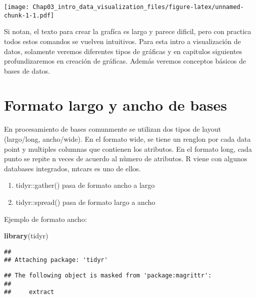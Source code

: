 \documentclass[]{book}
\newenvironment{Shaded}{\begin{snugshade}}{\end{snugshade}}
\newcommand{\DataTypeTok}[1]{\textcolor[rgb]{0.13,0.29,0.53}{#1}}
\newcommand{\KeywordTok}[1]{\textcolor[rgb]{0.13,0.29,0.53}{\textbf{#1}}}
\newcommand{\NormalTok}[1]{#1}
\newcommand{\OperatorTok}[1]{\textcolor[rgb]{0.81,0.36,0.00}{\textbf{#1}}}
\newcommand{\StringTok}[1]{\textcolor[rgb]{0.31,0.60,0.02}{#1}}
\providecommand{\tightlist}{%
  \setlength{\itemsep}{0pt}\setlength{\parskip}{0pt}}
\begin{document}
\texttt{[image: Chap03\_intro\_data\_visualization\_files/figure-latex/unnamed-chunk-1-1.pdf]}

Si notan, el texto para crear la grafíca es largo y parece dificil, pero con practica todos estos comandos se vuelven intuitivos. Para esta intro a visualización de datos, solamente veremos diferentes tipos de gráficas y en capitulos siguientes profundizaremos en creación de gráficas. Además veremos conceptos básicos de bases de datos.

\hypertarget{formato-largo-y-ancho-de-bases}{%
\section{Formato largo y ancho de bases}\label{formato-largo-y-ancho-de-bases}}

En procesamiento de bases comunmente se utilizan dos tipos de layout (largo/long, ancho/wide). En el formato wide, se tiene un renglon por cada data point y multiples columnas que contienen los atributos. En el formato long, cada punto se repite n veces de acuerdo al nùmero de atributos. R viene con algunos databases integrados, mtcars es uno de ellos.

\begin{enumerate}
\def\labelenumi{\arabic{enumi}.}
\tightlist
\item
  tidyr::gather() pasa de formato ancho a largo
\item
  tidyr::spread() pasa de formato largo a ancho
\end{enumerate}

Ejemplo de formato ancho:

\begin{Shaded}
\begin{Highlighting}[]
\KeywordTok{library}\NormalTok{(tidyr)}
\end{Highlighting}
\end{Shaded}

\begin{verbatim}
## 
## Attaching package: 'tidyr'
\end{verbatim}

\begin{verbatim}
## The following object is masked from 'package:magrittr':
## 
##     extract
\end{verbatim}

\begin{Shaded}
\end{Shaded}
\end{document}
